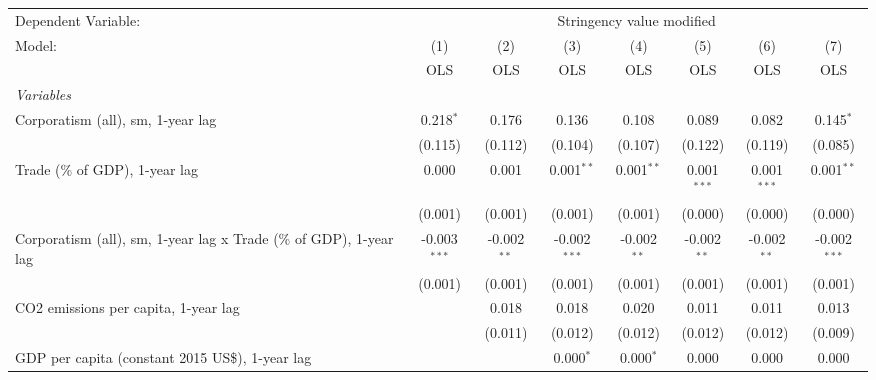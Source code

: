 
\begingroup
\centering
\begin{tabular}{lccccccc}
   \toprule
   Dependent Variable: & \multicolumn{7}{c}{Stringency value modified}\\
   Model:                                                             & (1)            & (2)           & (3)            & (4)           & (5)           & (6)           & (7)\\  
                                                                      &  OLS           & OLS           & OLS            & OLS           & OLS           & OLS           & OLS\\  
   \midrule
   \emph{Variables}\\
   Corporatism (all), sm, 1-year lag                                  & 0.218$^{*}$    & 0.176         & 0.136          & 0.108         & 0.089         & 0.082         & 0.145$^{*}$\\   
                                                                      & (0.115)        & (0.112)       & (0.104)        & (0.107)       & (0.122)       & (0.119)       & (0.085)\\   
   Trade (\% of GDP), 1-year lag                                      & 0.000          & 0.001         & 0.001$^{**}$   & 0.001$^{**}$  & 0.001$^{***}$ & 0.001$^{***}$ & 0.001$^{**}$\\   
                                                                      & (0.001)        & (0.001)       & (0.001)        & (0.001)       & (0.000)       & (0.000)       & (0.000)\\   
   Corporatism (all), sm, 1-year lag x Trade (\% of GDP), 1-year lag  & -0.003$^{***}$ & -0.002$^{**}$ & -0.002$^{***}$ & -0.002$^{**}$ & -0.002$^{**}$ & -0.002$^{**}$ & -0.002$^{***}$\\   
                                                                      & (0.001)        & (0.001)       & (0.001)        & (0.001)       & (0.001)       & (0.001)       & (0.001)\\   
   CO2 emissions per capita, 1-year lag                               &                & 0.018         & 0.018          & 0.020         & 0.011         & 0.011         & 0.013\\   
                                                                      &                & (0.011)       & (0.012)        & (0.012)       & (0.012)       & (0.012)       & (0.009)\\   
   GDP per capita (constant 2015 US\$), 1-year lag                    &                &               & 0.000$^{*}$    & 0.000$^{*}$   & 0.000         & 0.000         & 0.000\\   

\end{tabular}
